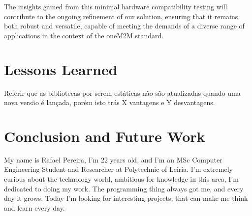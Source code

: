 \documentclass[a4paper,fleqn]{cas-dc}
\begin{document}
The insights gained from this minimal hardware compatibility testing will contribute to the ongoing refinement of our solution, ensuring that it remains both robust and versatile, capable of meeting the demands of a diverse range of applications in the context of the oneM2M standard.






%
%
%
%
%
%

\section{Lessons Learned}

Referir que as bibliotecas por serem estáticas não são atualizadas quando uma nova versão é lançada, porém isto trás X vantagens e Y desvantagens.

\section{Conclusion and Future Work}
\label{conclusion}
\printcredits

%
%




My name is Rafael Pereira, I'm 22 years old, and I'm an MSc Computer Engineering Student and Researcher at Polytechnic of Leiria. I'm extremely curious about the technology world, ambitious for knowledge in this area, I'm dedicated to doing my work. The programming thing always got me, and every day it grows. Today I'm looking for interesting projects, that can make me think and learn every day.
\endbio
\end{document}
